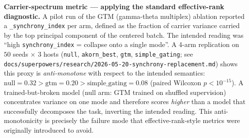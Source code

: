 \documentclass[10pt,twocolumn]{article}
\begin{document}
\textbf{Carrier-spectrum metric — applying the standard effective-rank diagnostic.}
A pilot run of the GTM (gamma-theta multiplex) ablation reported a
\texttt{\_synchrony\_index} per arm, defined as the fraction of carrier
variance carried by the top principal component of the centered batch.
The intended reading was ``high \texttt{synchrony\_index} = collapse onto a
single mode''. A 4-arm replication on $50$ seeds $\times$ $3$ hosts
(\texttt{null}, \texttt{akorn\_best}, \texttt{gtm},
\texttt{simple\_gating}; see \texttt{docs/superpowers/research/2026-05-20-synchrony-replacement.md})
shows this proxy is \emph{anti-monotone} with respect to the intended
semantics: $\text{null}{=}0.32 > \text{gtm}{=}0.20 > \text{simple\_gating}{=}0.08$
(paired Wilcoxon $p < 10^{-15}$). A trained-but-broken model
(null arm: GTM trained on shuffled supervision) concentrates variance
on one mode and therefore scores \emph{higher} than a model that
successfully decomposes the task, inverting the intended reading. This
anti-monotonicity is precisely the failure mode that effective-rank-style
metrics \cite{royvetterli2007erank} were originally introduced to avoid.
\end{document}
